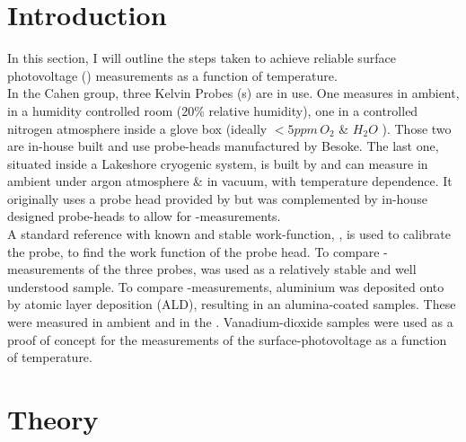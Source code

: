 \section{Introduction}

In this section, I will outline the steps taken to achieve reliable surface photovoltage (\spv{}) measurements as a function of temperature.\\
In the Cahen group, three Kelvin Probes (\kp{}s) are in use. One measures in ambient, in a humidity controlled room (20\% relative humidity), one in a controlled nitrogen atmosphere inside a glove box (ideally $<5ppm \,O_2 $ \& $ H_2O$ ). Those two are in-house built and use probe-heads manufactured by Besoke. The last one, situated inside a Lakeshore cryogenic system, is built by \McA{} and can measure in ambient under argon atmosphere \& in vacuum, with temperature dependence. It originally uses a probe head provided by \McA{} but was complemented by in-house designed probe-heads to allow for \spv{}-measurements. \\
A standard reference with known and stable work-function, \hopg{}, is used to calibrate the probe, \ie{} to find the work function of the probe head. To compare \cpd{}-measurements of the three probes,  \sih{} was used as a relatively stable and well understood sample. To compare \spv{}-measurements, aluminium was deposited onto \sih{} by atomic layer deposition (ALD), resulting in an alumina-coated samples. These were measured in ambient and in the \McA{}. Vanadium-dioxide samples were used as a proof of concept for the measurements of the surface-photovoltage as a function of temperature.
\section{Theory}
